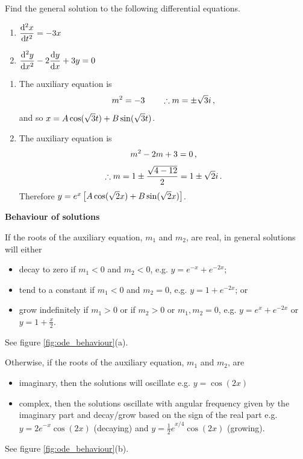 
\goodbreak
\begin{example}[Lecture]
\label{ex:664}
Find the general solution to the following differential equations.
\begin{enumerate}[label=(\alph*)]
\item $\displaystyle \frac{{\rm d} ^2x}{{\rm d} t^2}=-3x$
\item $\displaystyle \frac{{\rm d} ^2y}{{\rm d} x^2}-2\frac{{\rm d} y}{{\rm d} x}+3y=0$
\end{enumerate}
\end{example}
\begin{solution}
\begin{enumerate}[label=(\alph*)]
\item The auxiliary equation is
\[
m^2=-3\qquad\therefore m=\pm\sqrt3 i\, ,
\]
and so $x=A\cos(\sqrt3 t)+B\sin(\sqrt3 t)$.

\item The auxiliary equation is
\[
m^2-2m+3=0\, ,
\]
\[
\therefore m=1 \pm \frac{\sqrt{4-12}}2=1\pm\sqrt2 i\, .
\]
Therefore $y=e^x\left[A\cos(\sqrt2 x)+B\sin(\sqrt2 x)\right]$.
\end{enumerate}
\end{solution}


\textbf{Behaviour of solutions}

If the roots of the auxiliary equation, $m_1$ and $m_2$, are real, in general solutions will either
\begin{itemize}
\item decay to zero if $m_1<0$ and $m_2<0$, e.g. $y=e^{-x}+e^{-2x}$;
\item tend to a constant if $m_1<0$ and $m_2=0$, e.g. $y=1+e^{-2x}$; or
\item grow indefinitely if $m_1>0$ or if $m_2>0$ or $m_1,m_2=0$, e.g. $y=e^x+e^{-2x}$ or $y=1+\frac{x}{2}$.
\end{itemize}
See figure \ref{fig:ode_behaviour}(a). 

Otherwise, if the roots of the auxiliary equation, ${m}_{1}$ and ${m}_{2}$, are 
\begin{itemize} 
\item imaginary, then the solutions will oscillate e.g. $y=\cos \left(2x\right)$
\item complex, then the solutions oscillate with angular frequency given by the imaginary part and decay/grow based on the sign of the real part e.g. $y={2e}^{-x}\cos \left(2x\right)$ (decaying) and $y={\frac{1}{2}e}^{x/4}\cos \left(2x\right)$ (growing).
\end{itemize}
See figure \ref{fig:ode_behaviour}(b). 

